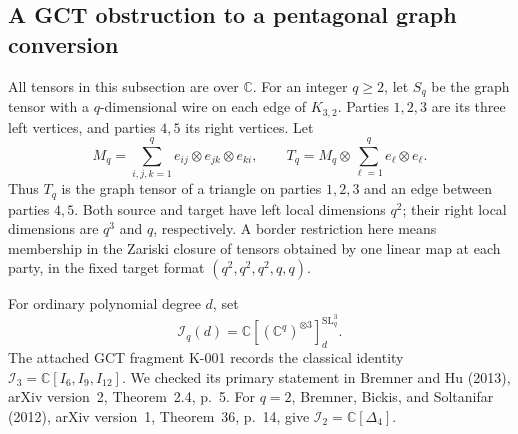 \subsection{A GCT obstruction to a pentagonal graph conversion}

All tensors in this subsection are over $\mathbb C$. For an integer
$q\geq2$, let $S_q$ be the graph tensor with a $q$-dimensional wire on
each edge of $K_{3,2}$. Parties $1,2,3$ are its three left vertices,
and parties $4,5$ its right vertices. Let
\[
 M_q=\sum_{i,j,k=1}^q e_{ij}\otimes e_{jk}\otimes e_{ki},
 \qquad
 T_q=M_q\otimes\sum_{\ell=1}^q e_\ell\otimes e_\ell.
\]
Thus $T_q$ is the graph tensor of a triangle on parties $1,2,3$ and
an edge between parties $4,5$. Both source and target have left local
dimensions $q^2$; their right local dimensions are $q^3$ and $q$,
respectively. A border restriction here means membership in the
Zariski closure of tensors obtained by one linear map at each party,
in the fixed target format $(q^2,q^2,q^2,q,q)$.

For ordinary polynomial degree $d$, set
\[
 \mathcal I_q(d)=
 \mathbb C[(\mathbb C^q)^{\otimes3}]^{\operatorname{SL}_q^3}_d.
\]
The attached GCT fragment K-001 records the classical identity
$\mathcal I_3=\mathbb C[I_6,I_9,I_{12}]$. We checked its primary
statement in Bremner and Hu (2013), arXiv version~2, Theorem~2.4,
p.~5. For $q=2$, Bremner, Bickis, and Soltanifar (2012), arXiv
version~1, Theorem~36, p.~14, give
$\mathcal I_2=\mathbb C[\Delta_4]$.

